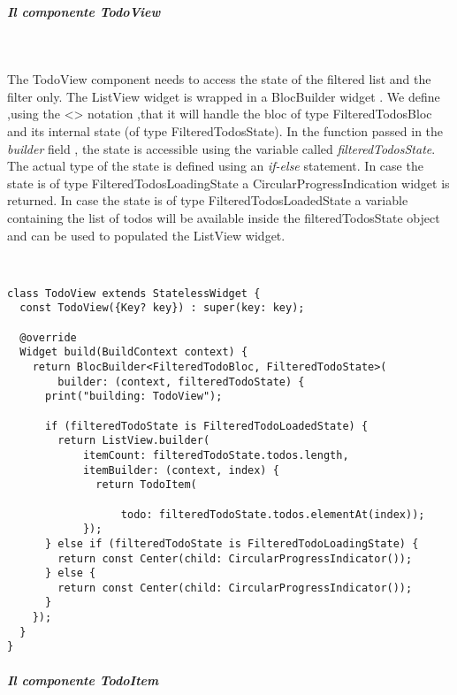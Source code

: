\subparagraph{Il componente TodoView}\mbox{}\\
\label{subpar:todo_app_bloc_core_state}

The TodoView component needs to access the state of the filtered list and the filter only. The ListView widget is wrapped in a BlocBuilder widget . We define ,using the <> notation ,that it will handle the bloc of type FilteredTodosBloc and its internal state (of type FilteredTodosState). In the function passed in the \textit{builder} field , the state is accessible using the variable called \textit{filteredTodosState}. The actual type of the state is defined using an \textit{if-else} statement. In case the state is of type FilteredTodosLoadingState a CircularProgressIndication widget is returned. In case the state is of type FilteredTodosLoadedState a variable containing the list of todos will be available inside the filteredTodosState object and can be used to populated the ListView widget.\begin{code}
\mbox{}\\
 \mbox{}
\label{code:2.14}
\begin{verbatim}
class TodoView extends StatelessWidget {
  const TodoView({Key? key}) : super(key: key);

  @override
  Widget build(BuildContext context) {
    return BlocBuilder<FilteredTodoBloc, FilteredTodoState>(
        builder: (context, filteredTodoState) {
      print("building: TodoView");

      if (filteredTodoState is FilteredTodoLoadedState) {
        return ListView.builder(
            itemCount: filteredTodoState.todos.length,
            itemBuilder: (context, index) {
              return TodoItem(
          
                  todo: filteredTodoState.todos.elementAt(index));
            });
      } else if (filteredTodoState is FilteredTodoLoadingState) {
        return const Center(child: CircularProgressIndicator());
      } else {
        return const Center(child: CircularProgressIndicator());
      }
    });
  }
}
\end{verbatim}
\mbox{}
\end{code}

\subparagraph{Il componente TodoItem}\mbox{}\\
\label{subpar:todo_app_bloc_core_state}

